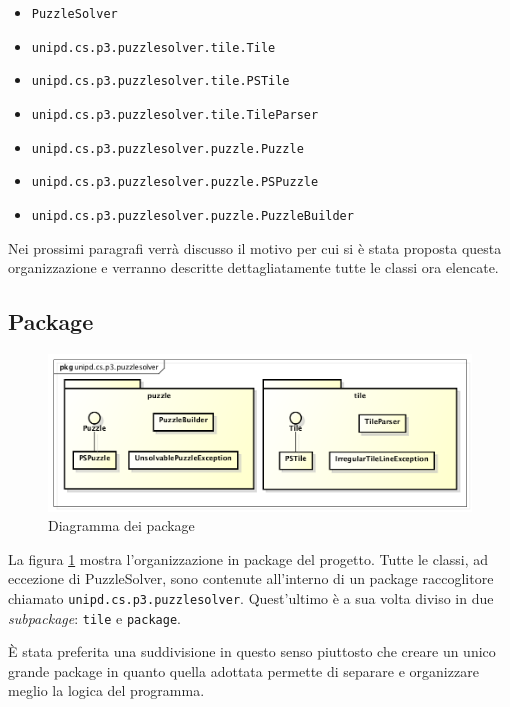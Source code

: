 \documentclass[a4paper, 12pt]{article}
\begin{document}
    \begin{itemize}

      \item \verb|PuzzleSolver|
      \item \verb|unipd.cs.p3.puzzlesolver.tile.Tile|
      \item \verb|unipd.cs.p3.puzzlesolver.tile.PSTile|
      \item \verb|unipd.cs.p3.puzzlesolver.tile.TileParser|
      \item \verb|unipd.cs.p3.puzzlesolver.puzzle.Puzzle|
      \item \verb|unipd.cs.p3.puzzlesolver.puzzle.PSPuzzle|
      \item \verb|unipd.cs.p3.puzzlesolver.puzzle.PuzzleBuilder|

    \end{itemize}

    Nei prossimi paragrafi verrà discusso il motivo per cui si è stata proposta questa organizzazione e verranno descritte dettagliatamente tutte le classi ora elencate.

    \subsection{Package}

      \begin{figure}[H]

        \centering
        \includegraphics[scale=0.5]{uml/packages.png}
        \caption{Diagramma dei package}
        \label{uml:packages}

      \end{figure}

      La figura \ref{uml:packages} mostra l'organizzazione in package del progetto. Tutte le classi, ad eccezione di PuzzleSolver, sono contenute all'interno di un package raccoglitore chiamato \verb|unipd.cs.p3.puzzlesolver|. Quest'ultimo è a sua volta diviso in due \emph{subpackage}: \verb|tile| e \verb|package|.

      È stata preferita una suddivisione in questo senso piuttosto che creare un unico grande package in quanto quella adottata permette di separare e organizzare meglio la logica del programma.
\end{document}

